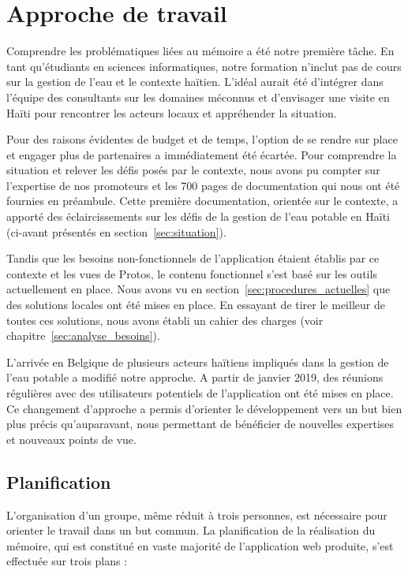 \documentclass{EPL-master-thesis-covers-FR}
\begin{document}
		\section{Approche de travail}

			Comprendre les problématiques liées au mémoire a été notre première tâche. En tant qu'étudiants en sciences informatiques, notre formation n'inclut pas de cours sur la gestion de l'eau et le contexte haïtien. L'idéal aurait été d'intégrer dans l'équipe des consultants sur les domaines méconnus et d'envisager une visite en Haïti pour rencontrer les acteurs locaux et appréhender la situation.

			Pour des raisons évidentes de budget et de temps, l'option de se rendre sur place et engager plus de partenaires a immédiatement été écartée. Pour comprendre la situation et relever les défis posés par le contexte, nous avons pu compter sur l'expertise de nos promoteurs et les 700 pages de documentation qui nous ont été fournies en préambule. Cette première documentation, orientée sur le contexte, a apporté des éclaircissements sur les défis de la gestion de l'eau potable en Haïti (ci-avant présentés en section~\ref{sec:situation}).

			Tandis que les besoins non-fonctionnels de l'application étaient établis par ce contexte et les vues de Protos, le contenu fonctionnel s'est basé sur les outils actuellement en place. Nous avons vu en section~\ref{sec:procedures_actuelles} que des solutions locales ont été mises en place. En essayant de tirer le meilleur de toutes ces solutions, nous avons établi un cahier des charges (voir chapitre~\ref{sec:analyse_besoins}).

			L'arrivée en Belgique de plusieurs acteurs haïtiens impliqués dans la gestion de l'eau potable a modifié notre approche. A partir de janvier 2019, des réunions régulières avec des utilisateurs potentiels de l'application ont été mises en place. Ce changement d'approche a permis d'orienter le développement vers un but bien plus précis qu'auparavant, nous permettant de bénéficier de nouvelles expertises et nouveaux points de vue.

			\subsection*{Planification}
				\label{sec:planification}

				L'organisation d'un groupe, même réduit à trois personnes, est nécessaire pour orienter le travail dans un but commun. La planification de la réalisation du mémoire, qui est constitué en vaste majorité de l'application web produite, s'est effectuée sur trois plans :
\end{document}
